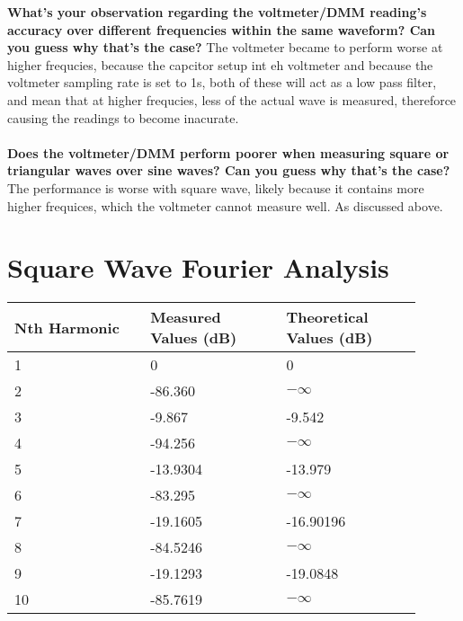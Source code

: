\documentclass[12pt]{article}
\begin{document}
\textbf{What's  your  observation  regarding  the  voltmeter/DMM  reading’s  accuracy  over  different 
frequencies within the same waveform? Can you guess why that's the case? }
The voltmeter became to perform worse at higher frequcies, because the capcitor setup int eh voltmeter and because the voltmeter sampling rate is set to 1s, both of these will act as a low pass filter, and mean that at higher frequcies, less of the actual wave is measured, thereforce causing the readings to become inacurate.
\\\\
\textbf{Does the voltmeter/DMM perform poorer when measuring square or triangular waves over sine 
waves? Can you guess why that's the case? }
The performance is worse with square wave, likely because 
it contains more higher frequices, which the voltmeter cannot measure well.
As discussed above. 
\section*{Square Wave Fourier Analysis}
\begin{center}
    \begin{tabular}{|p{0.3\linewidth} | p{0.3\linewidth} |p{0.3\linewidth} |} 
     \hline
     Nth Harmonic & Measured Values (dB) & Theoretical Values (dB)\\ [0.5ex] 
     \hline\hline
     1 & 0 & 0\\
     \hline
     2 & -86.360 & $-\infty$\\
     \hline
     3 & -9.867 & -9.542\\
     \hline
     4 & -94.256 & $-\infty$\\
     \hline
     5 & -13.9304 & -13.979\\
     \hline
     6 & -83.295 & $-\infty$\\
     \hline
     7 & -19.1605 & -16.90196\\
     \hline
     8 & -84.5246 & $-\infty$\\
     \hline
     9 & -19.1293 & -19.0848\\
     \hline
     10 & -85.7619 & $-\infty$\\
     \hline
    \end{tabular}
\end{center}
\end{document}
